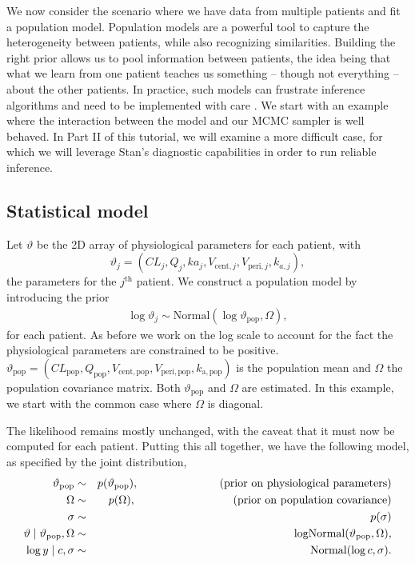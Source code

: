 
We now consider the scenario where we have data from multiple patients and fit a population model.
Population models are a powerful tool to capture the heterogeneity between patients, while also recognizing similarities.
Building the right prior allows us to pool information between patients, the idea being that what we learn from one patient teaches us something -- though not everything -- about the other patients.
In practice, such models can frustrate inference algorithms and need to be implemented with care \citep[e.g.][]{Betancourt:2013}.
We start with an example where the interaction between the model and our MCMC sampler is well behaved.
In Part II of this tutorial, we will examine a more difficult case, for which we will leverage Stan's diagnostic capabilities in order to run reliable inference.

\subsection{Statistical model} \label{sec:twoCptPop_stat}

Let $\vartheta$ be the 2D array of physiological parameters for each patient,
with
\begin{equation*}
  \vartheta_j = (CL_j, Q_j, ka_j, V_{\mathrm{cent}, j}, V_{\mathrm{peri}, j}, k_{a, j}),
\end{equation*} 
the parameters for the $j^\mathrm{th}$ patient.
We construct a population model by introducing the prior 
\begin{eqnarray*}
  \log \vartheta_j \sim \mathrm{Normal} (\log \vartheta_\mathrm{pop}, \Omega),
\end{eqnarray*}
for each patient.
As before we work on the log scale to account for the fact the physiological parameters are constrained to be positive.
$\vartheta_\mathrm{pop} = (CL_\mathrm{pop}, Q_\mathrm{pop}, V_\mathrm{cent, pop}, V_\mathrm{peri, pop}, k_\mathrm{a, pop})$ is the population mean and $\Omega$ the population covariance matrix.
Both $\vartheta_\mathrm{pop}$ and $\Omega$ are estimated.
In this example, we start with the common case where $\Omega$ is diagonal.

The likelihood remains mostly unchanged, with the caveat that it must now be computed for each patient.
Putting this all together, we have the following model, as specified by the joint distribution,
\begin{eqnarray*}
  \vartheta_\mathrm{pop} & \sim & p(\vartheta_\mathrm{pop}), \hspace{1in} \text{(prior on physiological parameters)} \\
  \Omega & \sim & p(\Omega), \hspace{1.2in} \text{(prior on population covariance)} \\
  \sigma & \sim & p(\sigma) \\
  \vartheta \mid \vartheta_\mathrm{pop}, \Omega  & \sim  & \mathrm{logNormal}(\vartheta_\mathrm{pop}, \Omega), \\
  \log y \mid c, \sigma & \sim & \mathrm{Normal}(\log c, \sigma).
\end{eqnarray*}

